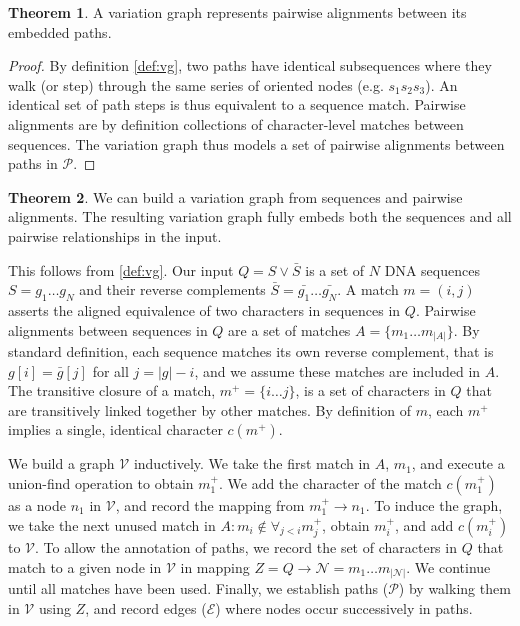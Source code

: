 \documentclass{bioinfo}
\theoremstyle{definition}
\newtheorem{theorem}{Theorem}[section]
\begin{document}
\begin{theorem}
A variation graph represents pairwise alignments between its embedded paths.
\end{theorem}

\begin{proof}
By definition \ref{def:vg}, two paths have identical subsequences where they walk (or step) through the same series of oriented nodes (e.g. $s_1 s_2 s_3$).
An identical set of path steps is thus equivalent to a sequence match.
Pairwise alignments are by definition collections of character-level matches between sequences.
The variation graph thus models a set of pairwise alignments between paths in $\mathcal{P}$.
\end{proof}

\begin{theorem}
\label{thm:seqwish}
We can build a variation graph from sequences and pairwise alignments.
The resulting variation graph fully embeds both the sequences and all pairwise relationships in the input.
\end{theorem}

This follows from \ref{def:vg}.
Our input $Q = S \vee \bar{S}$ is a set of $N$ DNA sequences $S = g_1 \ldots g_N$ and their reverse complements $\bar{S} = \bar{g_1} \ldots \bar{g_N}$.
A match $m = (i, j)$ asserts the aligned equivalence of two characters in sequences in $Q$.
Pairwise alignments between sequences in $Q$ are a set of matches $A = \{ m_1 \ldots m_{|A|} \}$.
By standard definition, each sequence matches its own reverse complement, that is $g[i] = \bar{g}[j]$ for all $j = |g| - i$, and we assume these matches are included in $A$.
The transitive closure of a match, $m^+ = \{ i \ldots j \}$, is a set of characters in $Q$ that are transitively linked together by other matches.
By definition of $m$, each $m^+$ implies a single, identical character $c(m^+)$.

We build a graph $\mathcal{V}$ inductively.
We take the first match in $A$, $m_1$, and execute a union-find operation to obtain $m_1^+$.
We add the character of the match $c(m_1^+)$ as a node $n_1$ in $\mathcal{V}$, and record the mapping from $m_1^+ \to n_1$.
To induce the graph, we take the next unused match in $A : m_i \notin \forall_{j < i} m_j^+$, obtain $m_i^+$, and add $c(m_i^+)$ to $\mathcal{V}$.
To allow the annotation of paths, we record the set of characters in $Q$ that match to a given node in $\mathcal{V}$ in mapping $Z = Q \to \mathcal{N} = m_1 \ldots m_{|\mathcal{N}|}$.
We continue until all matches have been used.
Finally, we establish paths ($\mathcal{P}$) by walking them in $\mathcal{V}$ using $Z$, and record edges ($\mathcal{E}$) where nodes occur successively in paths.
\end{document}

